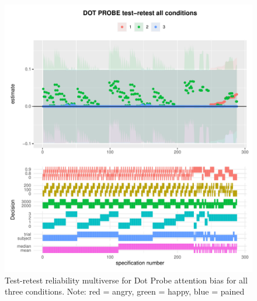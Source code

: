 \documentclass[
  english,
  man,floatsintext]{apa6}
\begin{document}
\begin{figure}
\centering
\includegraphics{half_trials_files/figure-latex/unnamed-chunk-13-1.pdf}
\caption{\label{fig:unnamed-chunk-13}Test-retest reliability multiverse for Dot Probe attention bias for all three conditions. Note: red = angry, green = happy, blue = pained}
\end{figure}
\end{document}
